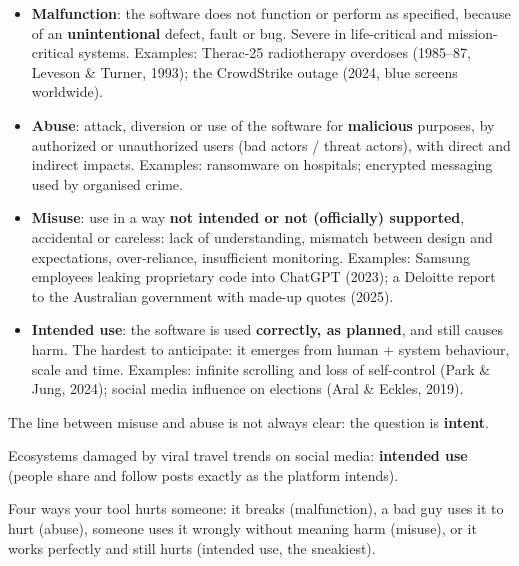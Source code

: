 \documentclass[11pt,a4paper,openany]{book}
\begin{document}
\begin{defnbox}[title={Four scenarios of harm (Parasuraman \& Riley, 1997)}]
\begin{itemize}
  \item \textbf{Malfunction}: the software does not function or perform as specified, because
        of an \textbf{unintentional} defect, fault or bug. Severe in life-critical and
        mission-critical systems. Examples: Therac-25 radiotherapy overdoses (1985--87, Leveson
        \& Turner, 1993); the CrowdStrike outage (2024, blue screens worldwide).
  \item \textbf{Abuse}: attack, diversion or use of the software for \textbf{malicious}
        purposes, by authorized or unauthorized users (bad actors / threat actors), with direct
        and indirect impacts. Examples: ransomware on hospitals; encrypted messaging used by
        organised crime.
  \item \textbf{Misuse}: use in a way \textbf{not intended or not (officially) supported},
        accidental or careless: lack of understanding, mismatch between design and
        expectations, over-reliance, insufficient monitoring. Examples: Samsung employees
        leaking proprietary code into ChatGPT (2023); a Deloitte report to the Australian
        government with made-up quotes (2025).
  \item \textbf{Intended use}: the software is used \textbf{correctly, as planned}, and still
        causes harm. The hardest to anticipate: it emerges from human + system behaviour, scale
        and time. Examples: infinite scrolling and loss of self-control (Park \& Jung, 2024);
        social media influence on elections (Aral \& Eckles, 2019).
\end{itemize}
The line between misuse and abuse is not always clear: the question is \textbf{intent}.
\end{defnbox}

\begin{exbox}[title={Review question}]
Ecosystems damaged by viral travel trends on social media: \textbf{intended use} (people share
and follow posts exactly as the platform intends).
\end{exbox}

\begin{goatbox}
Four ways your tool hurts someone: it breaks (malfunction), a bad guy uses it to hurt
(abuse), someone uses it wrongly without meaning harm (misuse), or it works perfectly and
still hurts (intended use, the sneakiest).
\end{goatbox}
\end{document}

